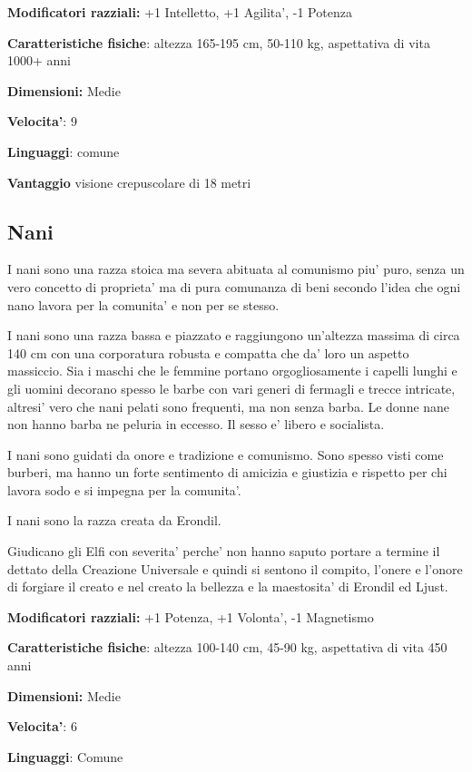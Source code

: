 \documentclass[a4paper,11pt,twoside,openany]{dndbook}
\begin{document}
\textbf{Modificatori razziali:} +1 Intelletto, +1 Agilita', -1 Potenza

\textbf{Caratteristiche fisiche}: altezza 165-195 cm, 50-110 kg, aspettativa
di vita 1000+ anni

\textbf{Dimensioni:} Medie

\textbf{Velocita'}: 9

\textbf{Linguaggi}: comune

\textbf{Vantaggio} visione crepuscolare di 18 metri

\subsection{Nani}

\label{nani}

I nani sono una razza stoica ma severa abituata al comunismo piu' puro, senza un vero concetto di proprieta' ma di pura comunanza di beni secondo l'idea che ogni nano lavora per la comunita' e non per se stesso.

I nani sono una razza bassa e piazzato e raggiungono un'altezza massima di circa 140 cm con una corporatura robusta e compatta che da' loro un aspetto massiccio. Sia i maschi che le femmine portano orgogliosamente i capelli lunghi e gli uomini decorano spesso le barbe con vari generi di fermagli e trecce intricate, altresi' vero che nani pelati sono frequenti, ma non senza barba. Le donne nane non hanno barba ne peluria in eccesso. Il sesso e' libero e socialista.

I nani sono guidati da onore e tradizione e comunismo. Sono spesso visti come burberi, ma hanno un forte sentimento di amicizia e giustizia e rispetto per chi lavora sodo e si impegna per la comunita'.

I nani sono la razza creata da Erondil.

Giudicano gli Elfi con severita' perche' non hanno saputo portare a termine il dettato della Creazione Universale e quindi si sentono il compito, l'onere e l'onore di forgiare il creato e nel creato la bellezza e la maestosita' di Erondil ed Ljust. 

\textbf{Modificatori razziali:} +1 Potenza, +1 Volonta', -1 Magnetismo

\textbf{Caratteristiche fisiche}: altezza 100-140 cm, 45-90 kg, aspettativa
di vita 450 anni

\textbf{Dimensioni:} Medie

\textbf{Velocita'}: 6

\textbf{Linguaggi}: Comune
\end{document}
